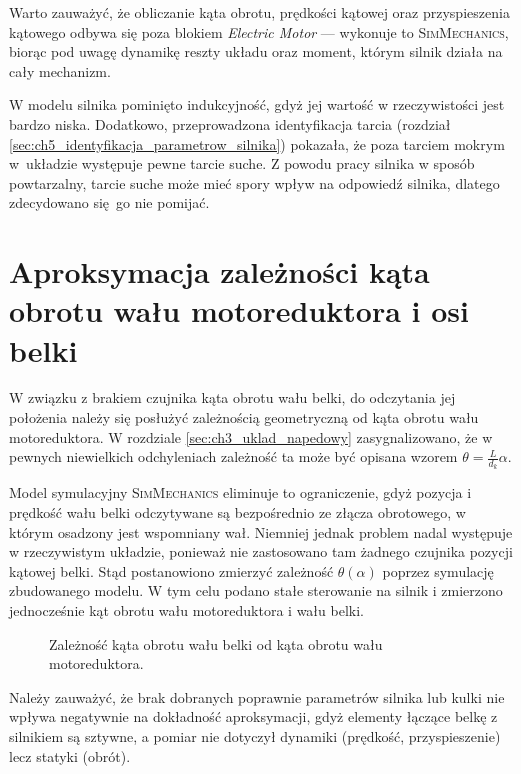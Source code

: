 Warto zauważyć, że obliczanie kąta obrotu, prędkości kątowej oraz przyspieszenia kątowego odbywa się poza blokiem \textit{Electric Motor} --- wykonuje to \textsc{SimMechanics}, biorąc pod uwagę dynamikę reszty układu oraz moment, którym silnik działa na cały mechanizm.

W modelu silnika pominięto indukcyjność, gdyż jej wartość w rzeczywistości jest bardzo niska. Dodatkowo, przeprowadzona identyfikacja tarcia (rozdział \ref{sec:ch5_identyfikacja_parametrow_silnika}) pokazała, że poza tarciem mokrym w~układzie występuje pewne tarcie suche. Z powodu pracy silnika w sposób powtarzalny, tarcie suche może mieć spory wpływ na odpowiedź silnika, dlatego zdecydowano się go nie pomijać.

\section{Aproksymacja zależności kąta obrotu wału motoreduktora i osi belki}
\label{sec:ch4_zaleznosc_kata_silnika_i_kata_belki}

W związku z brakiem czujnika kąta obrotu wału belki, do odczytania jej położenia należy się posłużyć zależnością geometryczną od kąta obrotu wału motoreduktora. W rozdziale \ref{sec:ch3_uklad_napedowy} zasygnalizowano, że w pewnych niewielkich odchyleniach zależność ta może być opisana wzorem $\theta = \frac{L}{d_k} \alpha$.

Model symulacyjny \textsc{SimMechanics} eliminuje to ograniczenie, gdyż pozycja i prędkość wału belki odczytywane są bezpośrednio ze złącza obrotowego, w którym osadzony jest wspomniany wał. Niemniej jednak problem nadal występuje w rzeczywistym układzie, ponieważ nie zastosowano tam żadnego czujnika pozycji kątowej belki. Stąd postanowiono zmierzyć zależność $\theta(\alpha)$ poprzez symulację zbudowanego modelu. W tym celu podano stałe sterowanie na silnik i zmierzono jednocześnie kąt obrotu wału motoreduktora i wału belki.

\begin{figure}[h]
    \centering
    
    \caption{Zależność kąta obrotu wału belki od kąta obrotu wału motoreduktora.}
    \label{fig:zaleznosc_kata_belki_od_enkodera}
\end{figure}

Należy zauważyć, że brak dobranych poprawnie parametrów silnika lub kulki nie wpływa negatywnie na dokładność aproksymacji, gdyż elementy łączące belkę z silnikiem są sztywne, a pomiar nie dotyczył dynamiki (prędkość, przyspieszenie) lecz statyki (obrót).

